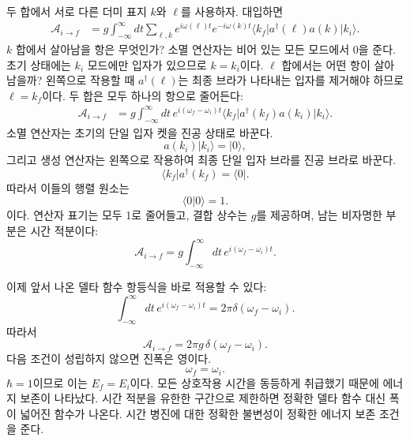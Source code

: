 두 합에서 서로 다른 더미 표지 \(k\)와 \(\ell\)를 사용하자. 대입하면
\begin{align}
\mathcal A_{i\to f}
&=g\int_{-\infty}^{\infty}dt
\sum_{\ell,k}
e^{i\omega(\ell)t}e^{-i\omega(k)t}
\langle k_f\rvert a^\dagger(\ell)a(k)\lvert k_i\rangle.
\end{align}
\(k\) 합에서 살아남을 항은 무엇인가? 소멸 연산자는 비어 있는 모든 모드에서 0을 준다. 초기 상태에는 \(k_i\) 모드에만 입자가 있으므로 \(k=k_i\)이다. \(\ell\) 합에서는 어떤 항이 살아남을까? 왼쪽으로 작용할 때 \(a^\dagger(\ell)\)는 최종 브라가 나타내는 입자를 제거해야 하므로 \(\ell=k_f\)이다. 두 합은 모두 하나의 항으로 줄어든다:
\begin{align}
\mathcal A_{i\to f}
&=g\int_{-\infty}^{\infty}dt\,
e^{i(\omega_f-\omega_i)t}
\langle k_f\rvert a^\dagger(k_f)a(k_i)\lvert k_i\rangle.
\end{align}
소멸 연산자는 초기의 단일 입자 켓을 진공 상태로 바꾼다.
\begin{equation}
a(k_i)\lvert k_i\rangle=\lvert0\rangle,
\end{equation}
그리고 생성 연산자는 왼쪽으로 작용하여 최종 단일 입자 브라를 진공 브라로 바꾼다.
\begin{equation}
\langle k_f\rvert a^\dagger(k_f)=\langle0\rvert.
\end{equation}
따라서 이들의 행렬 원소는
\begin{equation}
\langle0\vert0\rangle=1.
\end{equation}
이다. 연산자 표기는 모두 1로 줄어들고, 결합 상수는 \(g\)를 제공하며, 남는 비자명한 부분은 시간 적분이다:
\begin{equation}
\mathcal A_{i\to f}
=g\int_{-\infty}^{\infty}dt\,
e^{i(\omega_f-\omega_i)t}.
\end{equation}


이제 앞서 나온 델타 함수 항등식을 바로 적용할 수 있다:
\begin{equation}
\int_{-\infty}^{\infty}dt\,
e^{i(\omega_f-\omega_i)t}
=2\pi\delta(\omega_f-\omega_i).
\end{equation}
따라서
\begin{equation}
\boxed{
\mathcal A_{i\to f}
=2\pi g\,\delta(\omega_f-\omega_i)
}.
\end{equation}
다음 조건이 성립하지 않으면 진폭은 영이다.
\begin{equation}
\omega_f=\omega_i.
\end{equation}
\(\hbar=1\)이므로 이는 \(E_f=E_i\)이다. 모든 상호작용 시간을 동등하게 취급했기 때문에 에너지 보존이 나타났다. 시간 적분을 유한한 구간으로 제한하면 정확한 델타 함수 대신 폭이 넓어진 함수가 나온다. 시간 병진에 대한 정확한 불변성이 정확한 에너지 보존 조건을 준다.

